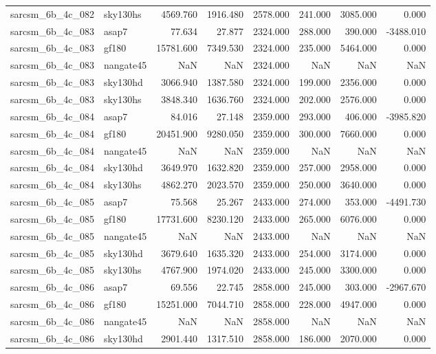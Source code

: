 \begin{tabular}{llrrrrrr}
sarcsm\_6b\_4c\_082 & sky130hs & 4569.760 & 1916.480 & 2578.000 & 241.000 & 3085.000 & 0.000 \\
sarcsm\_6b\_4c\_083 & asap7 & 77.634 & 27.877 & 2324.000 & 288.000 & 390.000 & -3488.010 \\
sarcsm\_6b\_4c\_083 & gf180 & 15781.600 & 7349.530 & 2324.000 & 235.000 & 5464.000 & 0.000 \\
sarcsm\_6b\_4c\_083 & nangate45 & NaN & NaN & 2324.000 & NaN & NaN & NaN \\
sarcsm\_6b\_4c\_083 & sky130hd & 3066.940 & 1387.580 & 2324.000 & 199.000 & 2356.000 & 0.000 \\
sarcsm\_6b\_4c\_083 & sky130hs & 3848.340 & 1636.760 & 2324.000 & 202.000 & 2576.000 & 0.000 \\
sarcsm\_6b\_4c\_084 & asap7 & 84.016 & 27.148 & 2359.000 & 293.000 & 406.000 & -3985.820 \\
sarcsm\_6b\_4c\_084 & gf180 & 20451.900 & 9280.050 & 2359.000 & 300.000 & 7660.000 & 0.000 \\
sarcsm\_6b\_4c\_084 & nangate45 & NaN & NaN & 2359.000 & NaN & NaN & NaN \\
sarcsm\_6b\_4c\_084 & sky130hd & 3649.970 & 1632.820 & 2359.000 & 257.000 & 2958.000 & 0.000 \\
sarcsm\_6b\_4c\_084 & sky130hs & 4862.270 & 2023.570 & 2359.000 & 250.000 & 3640.000 & 0.000 \\
sarcsm\_6b\_4c\_085 & asap7 & 75.568 & 25.267 & 2433.000 & 274.000 & 353.000 & -4491.730 \\
sarcsm\_6b\_4c\_085 & gf180 & 17731.600 & 8230.120 & 2433.000 & 265.000 & 6076.000 & 0.000 \\
sarcsm\_6b\_4c\_085 & nangate45 & NaN & NaN & 2433.000 & NaN & NaN & NaN \\
sarcsm\_6b\_4c\_085 & sky130hd & 3679.640 & 1635.320 & 2433.000 & 254.000 & 3174.000 & 0.000 \\
sarcsm\_6b\_4c\_085 & sky130hs & 4767.900 & 1974.020 & 2433.000 & 245.000 & 3300.000 & 0.000 \\
sarcsm\_6b\_4c\_086 & asap7 & 69.556 & 22.745 & 2858.000 & 245.000 & 303.000 & -2967.670 \\
sarcsm\_6b\_4c\_086 & gf180 & 15251.000 & 7044.710 & 2858.000 & 228.000 & 4947.000 & 0.000 \\
sarcsm\_6b\_4c\_086 & nangate45 & NaN & NaN & 2858.000 & NaN & NaN & NaN \\
sarcsm\_6b\_4c\_086 & sky130hd & 2901.440 & 1317.510 & 2858.000 & 186.000 & 2070.000 & 0.000 \\

\end{tabular}
